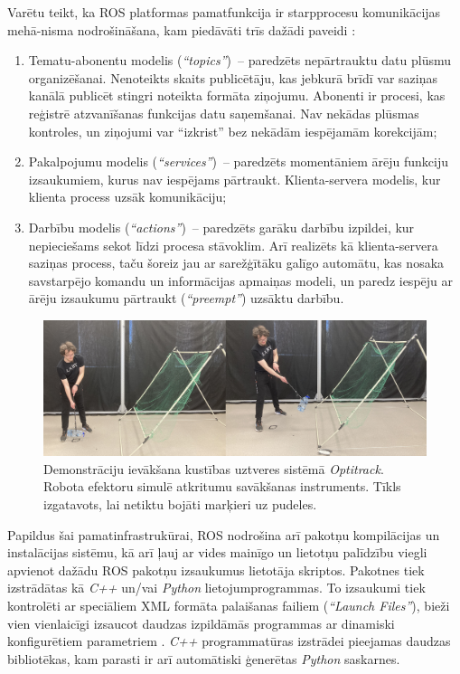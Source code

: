 \documentclass[12pt, a4paper]{article}
\numberwithin{equation}{section} %
\begin{document}
Varētu teikt, ka ROS platformas pamatfunkcija ir starpprocesu komunikācijas mehā-nisma nodrošināšana, kam piedāvāti trīs dažādi paveidi \cite{ros_comm_patterns}:

\begin{enumerate}
    \item Tematu-abonentu modelis (\textit{``topics''})~-- paredzēts nepārtrauktu datu plūsmu organizēšanai. Nenoteikts skaits publicētāju, kas jebkurā brīdī var saziņas kanālā publicēt stingri noteikta formāta ziņojumu. Abonenti ir procesi, kas reģistrē atzvanīšanas funkcijas datu saņemšanai. Nav nekādas plūsmas kontroles, un ziņojumi var ``izkrist'' bez nekādām iespējamām korekcijām;
    \item Pakalpojumu modelis (\textit{``services''})~-- paredzēts momentāniem ārēju funkciju izsaukumiem, kurus nav iespējams pārtraukt. Klienta-servera modelis, kur klienta process uzsāk komunikāciju;
    \item Darbību modelis (\textit{``actions''})~-- paredzēts garāku darbību izpildei, kur nepieciešams sekot līdzi procesa stāvoklim. Arī realizēts kā klienta-servera saziņas process, taču šoreiz jau ar sarežģītāku galīgo automātu, kas nosaka savstarpējo komandu un informācijas apmaiņas modeli, un paredz iespēju ar ārēju izsaukumu pārtraukt (\textit{``preempt''}) uzsāktu darbību.
\end{enumerate}


\begin{figure}[t!]
    \centering
    \includegraphics[width=16cm,page=1]{../img/throw_demo.jpg}
    \caption{Demonstrāciju ievākšana kustības uztveres sistēmā \textit{Optitrack}. Robota efektoru simulē atkritumu savākšanas instruments. Tīkls izgatavots, lai netiktu bojāti marķieri uz pudeles.}
    \label{optitrack_throw}
\end{figure}

Papildus šai pamatinfrastrukūrai, ROS nodrošina arī pakotņu kompilācijas un instalācijas sistēmu, kā arī ļauj ar vides mainīgo un lietotņu palīdzību viegli apvienot dažādu ROS pakotņu izsaukumus lietotāja skriptos. Pakotnes tiek izstrādātas kā \textit{C++} un/vai \textit{Python} lietojumprogrammas. To izsaukumi tiek kontrolēti ar speciāliem XML formāta palaišanas failiem (\textit{``Launch Files''}), bieži vien vienlaicīgi izsaucot daudzas izpildāmās programmas ar dinamiski konfigurētiem parametriem \cite{roslaunch_file}. \textit{C++} programmatūras izstrādei pieejamas daudzas bibliotēkas, kam parasti ir arī automātiski ģenerētas \textit{Python} saskarnes.
\end{document}
